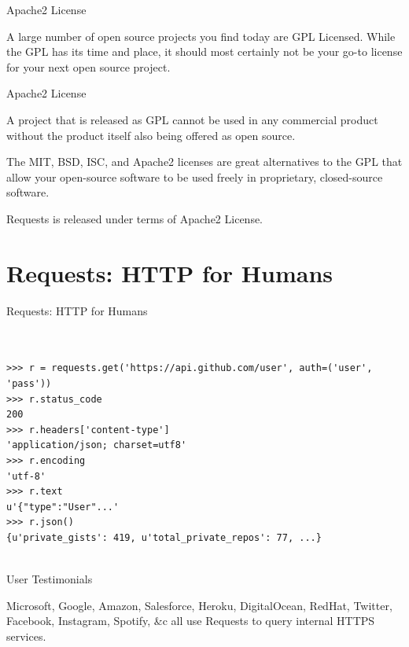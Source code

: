 \documentclass{beamer}
\begin{document}
\begin{frame}[t]{Apache2 License}

A large number of open source projects you find today are GPL Licensed.
While the GPL has its time and place, it should most certainly not be your
go-to license for your next open source project.

\end{frame}


\begin{frame}[t]{Apache2 License}

A project that is released as GPL cannot be used in any commercial product
without the product itself also being offered as open source.


The MIT, BSD, ISC, and Apache2 licenses are great alternatives to the GPL
that allow your open-source software to be used freely in proprietary,
closed-source software.

Requests is released under terms of Apache2 License.
\end{frame}



\section{Requests: HTTP for Humans} %
\label{sec:Requests: HTTP for Humans}



\begin{frame}[t,fragile]{Requests: HTTP for Humans}


    \scriptsize

\begin{verbatim}


>>> r = requests.get('https://api.github.com/user', auth=('user', 'pass'))
>>> r.status_code
200
>>> r.headers['content-type']
'application/json; charset=utf8'
>>> r.encoding
'utf-8'
>>> r.text
u'{"type":"User"...'
>>> r.json()
{u'private_gists': 419, u'total_private_repos': 77, ...}


\end{verbatim}


\end{frame}


% 
% 




\begin{frame}[t]{User Testimonials}

Microsoft, Google, Amazon, Salesforce, Heroku, DigitalOcean, RedHat, Twitter, Facebook, Instagram, Spotify, \&c all use Requests to query internal HTTPS services.

\end{frame}
\end{document}
